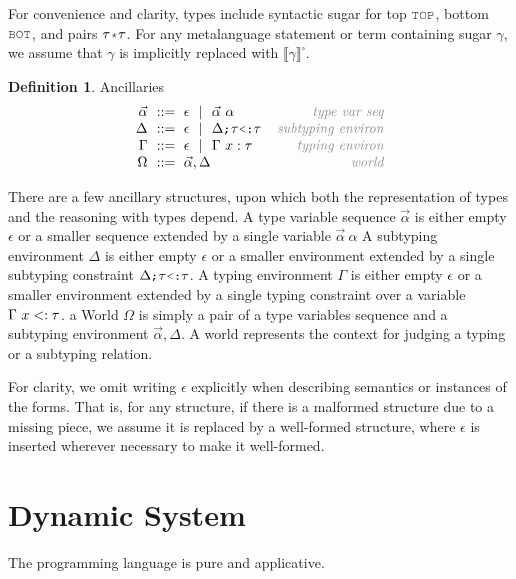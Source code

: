 \documentclass[acmsmall]{acmart}
\theoremstyle{definition}
\newtheorem{definition}{Definition}[section]
\begin{document}
For convenience and clarity, types include syntactic sugar for top $\J{TOP}$, 
bottom $\J{BOT}$, and pairs $\tau \J{*} \tau$.
For any metalanguage statement or term containing sugar $\gamma$, we assume that $\gamma$ is implicitly replaced with $\llbracket \gamma \rrbracket^\square$.


\begin{definition} Ancillaries 
  \label{def:type_ancillaries}
  \[\begin{array}[t]{r@{}l@{}r}
    \nonterm{\vec{\alpha}} & \is \epsilon \sep \vec{\alpha}\ \alpha 
    & \com{type var seq}
    \\
    \nonterm{\Delta} & \is \epsilon \sep \Delta \J{;} \tau \J{<:} \tau
    & \com{subtyping environ}
    \\
    \nonterm{\Gamma} & \is \epsilon \sep \Gamma\ x \hastype \tau
    & \com{typing environ}
    \\
    \nonterm{\Omega} & \is \vec{\alpha},\Delta 
    & \com{world}
  \end{array}\]
\end{definition}


There are a few ancillary structures, upon which both the representation of types and the reasoning with types depend.
A type variable sequence $\vec{\alpha}$ is either empty $\epsilon$ or a smaller sequence extended by a single variable $\vec{\alpha}\ \alpha$
A subtyping environment $\Delta$ is either empty $\epsilon$ or a smaller environment extended by a single
subtyping constraint $\Delta \J{;} \tau \J{<:} \tau$.
A typing environment $\Gamma$ is either empty $\epsilon$ or a smaller environment extended by a single
typing constraint over a variable $\Gamma\ x <: \tau$.
a World $\Omega$ is simply a pair of a type variables sequence and a subtyping environment $\vec{\alpha}, \Delta$.
A world represents the context for judging a typing or a subtyping relation.


For clarity, we omit writing $\epsilon$ explicitly when describing semantics or instances of the forms.
That is, for any structure, if there is a malformed structure due to a missing piece, 
we assume it is replaced by a well-formed structure, 
where $\epsilon$ is inserted wherever necessary to make it well-formed.

\section{Dynamic System}
\label{sec:dynamic_system}

The programming language is pure and applicative. 
\end{document}
